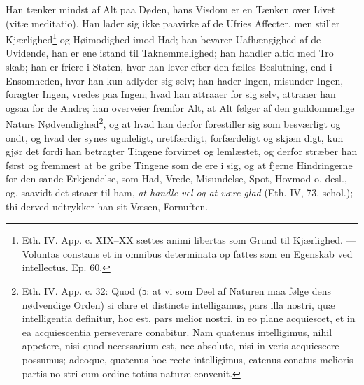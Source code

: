 \documentclass[12pt,a4paper]{book}
\newcommand{\opage}[1]{\marginnote{\footnotesize\textit{[#1]}}}
\begin{document}
Han tænker mindst
\opage{131} \setcounter{footnote}{0}%
af Alt paa Døden, hans Visdom er en Tænken over Livet
(vitæ meditatio). Han lader sig ikke paavirke af de Ufries
Affecter, men stiller Kjærlighed\footnote{Eth. IV. App. c. XIX--XX sættes animi libertas som Grund til
Kjærlighed. --- Voluntas constans et in omnibus determinata op\-%
fattes som en Egenskab ved intellectus. Ep. 60.} og Høimodighed imod
Had; han bevarer Uafhængighed af de Uvidende, han er
ene istand til Taknemmelighed; han handler altid med Tro\-%
skab; han er friere i Staten, hvor han lever efter den fælles
Beslutning, end i Ensomheden, hvor han kun adlyder sig
selv; han hader Ingen, misunder Ingen, foragter Ingen,
vredes paa Ingen; hvad han attraaer for sig selv, attraaer
han ogsaa for de Andre; han overveier fremfor Alt, at Alt
følger af den guddommelige Naturs Nødvendighed\footnote{Eth. IV. App. c. 32: Quod (ɔ: at vi som Deel af Naturen maa
følge dens nødvendige Orden) si clare et distincte intelligamus, pars
illa nostri, quæ intelligentia definitur, hoc est, pars melior nostri,
in eo plane acquiescet, et in ea acquiescentia perseverare conabitur.
Nam quatenus intelligimus, nihil appetere, nisi quod necessarium
est, nec absolute, nisi in veris acquiescere possumus; adeoque,
quatenus hoc recte intelligimus, eatenus conatus melioris partis no\-%
stri cum ordine totius naturæ convenit.}, og at
hvad han derfor forestiller sig som besværligt og ondt, og
hvad der synes ugudeligt, uretfærdigt, forfærdeligt og skjæn\-%
digt, kun gjør det fordi han betragter Tingene forvirret og
lemlæstet, og derfor stræber han først og fremmest at be\-%
gribe Tingene som de ere i sig, og at fjerne Hindringerne
for den sande Erkjendelse, som Had, Vrede, Misundelse,
Spot, Hovmod o. desl., og, saavidt det staaer til ham, \emph{at
handle vel og at være glad} (Eth. IV, 73. schol.); thi
derved udtrykker han sit Væsen, Fornuften.
\end{document}
